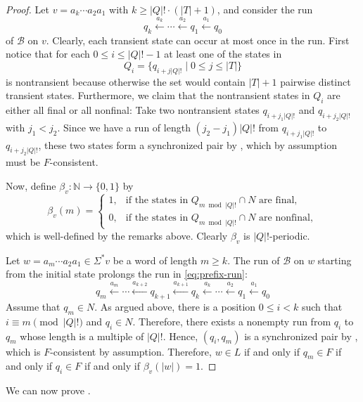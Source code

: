 \documentclass{theoretics}
\newcommand{\N}{\mathbb{N}}
\newcommand{\B}{\mathcal{B}}
\renewcommand{\geq}{\geqslant}
\renewcommand{\leq}{\leqslant}
\renewcommand{\ge}{\geq}
\renewcommand{\le}{\leq}
\begin{document}
\begin{proof}
	Let $v = a_k \cdots a_2 a_1$  with
	$k \ge |Q|! \cdot (|T|+1)$, and consider the run
	\begin{equation}
		\label{eq:prefix-run}
		q_k \xleftarrow{a_k} \cdots \xleftarrow{a_2} q_1 \xleftarrow{a_1} q_0
	\end{equation}
	of $\B$ on $v$.
	Clearly, each transient state can occur at most once in the run.
	First notice that for each $0 \le i \le |Q|!-1$ at least one of the states in
	\[
		Q_i = \{ q_{i+j|Q|!} \mid 0 \le j \le |T| \}
	\]
	is nontransient because otherwise the set would contain $|T|+1$ pairwise distinct transient states.
	Furthermore, we claim that the nontransient states in $Q_i$ are either all final or all nonfinal:
	Take two nontransient states $q_{i+j_1|Q|!}$ and $q_{i+j_2|Q|!}$ with $j_1 < j_2$.
	Since we have a run of length $(j_2-j_1)|Q|!$ from $q_{i+j_1|Q|!}$ to $q_{i+j_2|Q|!}$,
	these two states form a synchronized pair by , which by assumption must
	be $F$-consistent.
	
	Now, define $\beta_v \colon \N \to \{0,1\}$ by
	\[
		\beta_v(m) = \begin{cases}
		1, & \text{if the states in } Q_{m \bmod |Q|!} \cap N \text{ are final}, \\
		0, & \text{if the states in } Q_{m \bmod |Q|!} \cap N \text{ are nonfinal},
		\end{cases}
	\]
	which is well-defined by the remarks above.
	Clearly $\beta_v$ is $|Q|!$-periodic.
	
	Let $w = a_m \cdots a_2 a_1 \in \Sigma^* v$ be a word of length $m \ge k$.
	The run of $\B$ on $w$ starting from the initial state prolongs the run in \eqref{eq:prefix-run}:
	\[
		q_m \xleftarrow{a_m} \cdots \xleftarrow{a_{k+2}} q_{k+1} \xleftarrow{a_{k+1}} q_k \xleftarrow{a_k} \cdots \xleftarrow{a_2} q_1 \xleftarrow{a_1} q_0
	\]
	Assume that $q_m \in N$.
	As argued above, there is a position $0 \le i < k$
	such that $i \equiv m \pmod{|Q|!}$ and $q_i \in N$.
	Therefore, there exists a nonempty run from $q_i$ to $q_m$ whose length is a multiple of $|Q|!$.
	Hence, $(q_i,q_m)$ is a synchronized pair by ,
	which is $F$-consistent by assumption.
	Therefore, $w \in L$ if and only if $q_m \in F$ if and only if  $q_i \in F$ if and only if  $\beta_v(|w|) = 1$.
\end{proof}
We can now prove .
\end{document}
